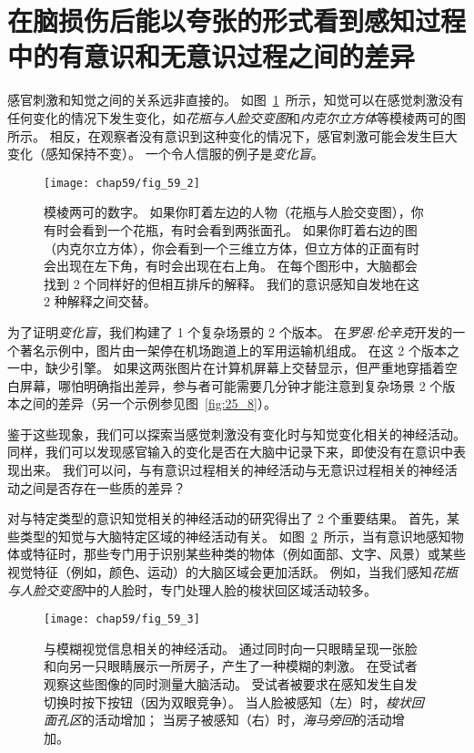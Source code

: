 \section{在脑损伤后能以夸张的形式看到感知过程中的有意识和无意识过程之间的差异}

感官刺激和知觉之间的关系远非直接的。
如图~\ref{fig:59_2}~所示，知觉可以在感觉刺激没有任何变化的情况下发生变化，如\textit{花瓶与人脸交变图}和\textit{内克尔立方体}等模棱两可的图所示。
相反，在观察者没有意识到这种变化的情况下，感官刺激可能会发生巨大变化（感知保持不变）。
一个令人信服的例子是\textit{变化盲}。


\begin{figure}[htbp]
	\centering
	\texttt{[image: chap59/fig\_59\_2]}
	\caption{模棱两可的数字。
		如果你盯着左边的人物（花瓶与人脸交变图），你有时会看到一个花瓶，有时会看到两张面孔。
		如果你盯着右边的图（内克尔立方体），你会看到一个三维立方体，但立方体的正面有时会出现在左下角，有时会出现在右上角。
		在每个图形中，大脑都会找到 2 个同样好的但相互排斥的解释。
		我们的意识感知自发地在这 2 种解释之间交替。}
	\label{fig:59_2}
\end{figure}


为了证明\textit{变化盲}，我们构建了 1 个复杂场景的 2 个版本。
在\textit{罗恩$\cdot$伦辛克}开发的一个著名示例中，图片由一架停在机场跑道上的军用运输机组成。
在这 2 个版本之一中，缺少引擎。
如果这两张图片在计算机屏幕上交替显示，但严重地穿插着空白屏幕，哪怕明确指出差异，参与者可能需要几分钟才能注意到复杂场景 2 个版本之间的差异（另一个示例参见图~\ref{fig:25_8}）。


鉴于这些现象，我们可以探索当感觉刺激没有变化时与知觉变化相关的神经活动。
同样，我们可以发现感官输入的变化是否在大脑中记录下来，即使没有在意识中表现出来。
我们可以问，与有意识过程相关的神经活动与无意识过程相关的神经活动之间是否存在一些质的差异？


对与特定类型的意识知觉相关的神经活动的研究得出了 2 个重要结果。
首先，某些类型的知觉与大脑特定区域的神经活动有关。
如图~\ref{fig:59_3}~所示，当有意识地感知物体或特征时，那些专门用于识别某些种类的物体（例如面部、文字、风景）或某些视觉特征（例如，颜色、运动）的大脑区域会更加活跃。
例如，当我们感知\textit{花瓶与人脸交变图}中的人脸时，专门处理人脸的梭状回区域活动较多。


\begin{figure}[htbp]
	\centering
	\texttt{[image: chap59/fig\_59\_3]}
	\caption{与模糊视觉信息相关的神经活动。
		通过同时向一只眼睛呈现一张脸和向另一只眼睛展示一所房子，产生了一种模糊的刺激。
		在受试者观察这些图像的同时测量大脑活动。
		受试者被要求在感知发生自发切换时按下按钮（因为双眼竞争）。
		当人脸被感知（左）时，\textit{梭状回面孔区}的活动增加；
		当房子被感知（右）时，\textit{海马旁回}的活动增加\cite{tong1998binocular}。}
	\label{fig:59_3}
\end{figure}


